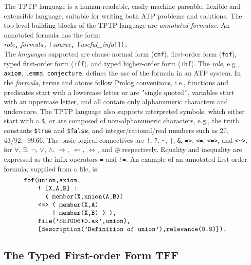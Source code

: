 \documentclass{easychair}
\begin{document}
The TPTP language is a human-readable, easily machine-parsable, flexible and
extensible language, suitable for writing both ATP problems and solutions.
The top level building blocks of the TPTP language are {\em annotated
formulae}.
An annotated formula has the form:\\
{\em role}{\tt ,}
{\em formula}{\tt ,}
{\tt [}{\em source}{\tt ,}
{\tt [}{\em useful\_info}{\tt ]]).}\\
The {\em language}s supported are clause normal form ({\tt cnf}),
first-order form ({\tt fof}), typed first-order form ({\tt tff}), and
typed higher-order form ({\tt thf}).
The {\em role}, e.g., {\tt axiom}, {\tt lemma}, {\tt conjecture},
defines the use of the formula in an ATP system.
In the {\em formula}, terms and atoms follow Prolog conventions, i.e.,
functions and predicates start with a lowercase letter or are {\tt '}single
quoted{\tt '}, variables start with an uppercase letter, and all
contain only alphanumeric characters and underscore.
The TPTP language also supports interpreted symbols, which either start with a
{\tt \$}, or are composed of non-alphanumeric characters, e.g., the truth
constants {\tt \$true} and {\tt \$false}, and integer/rational/real
numbers such as 27, 43/92, -99.66.
The basic logical connectives are
{\tt !}, {\tt ?}, {\tt \verb|~|}, {\tt |}, {\tt \&}, {\tt =>}, {\tt <=},
{\tt <=>}, and {\tt <\verb|~|>},
for
$\forall$, $\exists$, $\neg$, $\vee$, $\wedge$, $\Rightarrow$, $\Leftarrow$,
$\Leftrightarrow$, and $\oplus$ respectively.
Equality and inequality are expressed as the infix operators {\tt =} and
{\tt !=}.
An example of an annotated first-order formula, supplied from a file, is:
\[
\begin{minipage}{\textwidth}
\begin{verbatim}
    fof(union,axiom,
        ! [X,A,B] :
          ( member(X,union(A,B))
        <=> ( member(X,A)
            | member(X,B) ) ),
        file('SET006+0.ax',union),
        [description('Definition of union'),relevance(0.9)]).
\end{verbatim}
\end{minipage}
\]

\subsection{The Typed First-order Form TFF}
\label{TFF}
\end{document}
